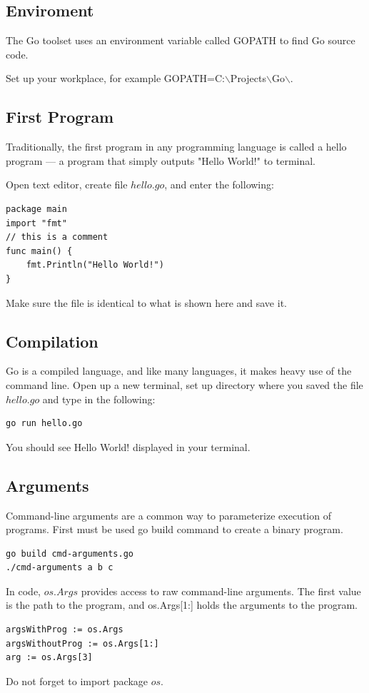 \documentclass[
  digital, %
  notable,   %
  lof,     %
  lot,     %
]{fithesis3}
\begin{document}
\subsection{Enviroment}
The Go toolset uses an environment variable called GOPATH to find Go source code. 

Set up your workplace, for example GOPATH=C:$\backslash$Projects$\backslash$Go$\backslash$.

\subsection{First Program}
Traditionally, the first program in any programming language is called a
hello program — a program that simply outputs "Hello World!" to terminal.

Open text editor, create file $hello.go$, and enter the following:
\begin{lstlisting}
package main
import "fmt"
// this is a comment
func main() {
	fmt.Println("Hello World!")
}
\end{lstlisting}
Make sure the file is identical to what is shown here and save it.

\subsection{Compilation}
Go is a compiled language, and like many languages, it makes heavy use of the command
line. Open up a new terminal, set up directory where you saved the file $hello.go$ and type in 
the following:
\begin{lstlisting}
go run hello.go
\end{lstlisting}
You should see Hello World! displayed in your terminal.

\subsection{Arguments}
Command-line arguments are a common way to parameterize execution of programs. First must be used go build command to create a binary program.
\begin{lstlisting}
go build cmd-arguments.go
./cmd-arguments a b c
\end{lstlisting}
In code, $os.Args$ provides access to raw command-line arguments. The first value is the path to the program, and os.Args[1:] holds the arguments to the program.
\begin{lstlisting}
argsWithProg := os.Args
argsWithoutProg := os.Args[1:]
arg := os.Args[3]
\end{lstlisting}
Do not forget to import package $os$.
\end{document}
